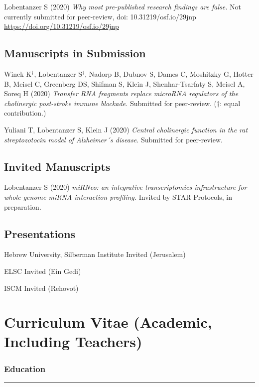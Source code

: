 \noindent Lobentanzer S (2020) \emph{Why most pre-published research findings are false.} Not currently submitted for peer-review, doi: 10.31219/osf.io/29jnp \url{https://doi.org/10.31219/osf.io/29jnp}

\subsection{Manuscripts in Submission}
\noindent Winek K$^\dagger$, Lobentanzer S$^\dagger$, Nadorp B, Dubnov S, Dames C, Moshitzky G, Hotter B, Meisel C, Greenberg DS, Shifman S, Klein J, Shenhar-Tsarfaty S, Meisel A, Soreq H (2020) \emph{Transfer RNA fragments replace microRNA regulators of the cholinergic post-stroke immune blockade.} Submitted for peer-review. ($\dagger$: equal contribution.)

\noindent Yuliani T, Lobentanzer S, Klein J (2020) \emph{Central cholinergic function in the rat streptozotocin model of Alzheimer´s disease.} Submitted for peer-review.




\subsection{Invited Manuscripts}
\noindent Lobentanzer S (2020) \emph{miRNeo: an integrative transcriptomics infrastructure for whole-genome miRNA interaction profiling.} Invited by STAR Protocols, in preparation.

\subsection{Presentations}
\noindent Hebrew University, Silberman Institute Invited (Jerusalem)

\noindent ELSC Invited (Ein Gedi)

\noindent ISCM Invited (Rehovot)

\newpage

\section{Curriculum Vitae (Academic, Including Teachers)}
\small

\subsubsection{\textbf{Education}}
\vspace{-8pt}
\hrule
\vspace{10pt}

